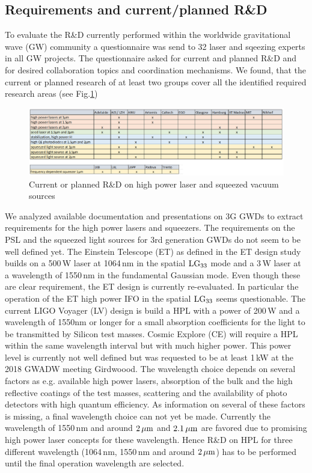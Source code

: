 \subsection{Requirements and current/planned R\&D}
To evaluate the R\&D currently performed within the worldwide gravitational wave (GW) community a questionnaire was send to 32 laser and sqeezing experts in all GW projects. The questionnaire asked for current and planned R\&D and for desired collaboration topics and coordination mechanisms. We found, that the current or planned research of at least two groups cover all the identified required research areas (see Fig.\ref{fig:LightSourceRD}) 

\begin{figure}[h]
	\includegraphics[scale=0.4]{Light_source_Fig1.png}
	\caption{Current or planned R\&D on high power laser and squeezed vacuum sources}
	\label{fig:LightSourceRD}
\end{figure}

We analyzed available documentation and presentations on 3G GWDs to extract requirements for the high power lasers and squeezers. 
The requirements on the PSL and the squeezed light sources for 3rd generation GWDs do not seem to be well defined yet. The Einstein Telescope (ET) as defined in the ET design study builds on a 500\,W laser at 1064\,nm in the spatial $\rm LG_{33}$ mode and a 3\,W laser at a wavelength of 1550\,nm in the fundamental Gaussian mode. Even though these are clear requirement, the ET design is currently re-evaluated. In particular the operation of the ET high power IFO in the spatial $\rm LG_{33}$ seems questionable. The current  LIGO Voyager (LV) design is build a HPL with a power of 200\,W and a wavelength of 1550nm or longer for a small absorption coefficients for the light to be transmitted by Silicon test masses. Cosmic Explore (CE) will require a HPL within the same wavelength interval but with much higher power. This power level is currently not well defined but was requested to be at least 1\,kW at the 2018 GWADW meeting Girdwoood. The wavelength choice depends on several factors as e.g. available high power lasers, absorption of the bulk and the high reflective coatings of the test masses, scattering and the availability of photo detectors with high quantum efficiency. As information on several of these factors is missing, a final wavelength choice can not yet be made. Currently the wavelength of 1550\,nm and around $\rm 2\, \mu m $ and $\rm 2.1\, \mu m $ are favored due to promising high power laser concepts for these wavelength. Hence R\&D on HPL for three different wavelength (1064\,nm, 1550\,nm and around $\rm 2\, \mu m $) has to be performed until the final operation wavelength are selected. 

